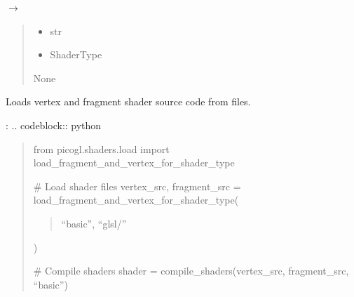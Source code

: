 \documentclass[a4paper,10pt,english,openany,oneside]{sphinxmanual}
\begin{document}
\begin{fulllineitems}
\label{\detokenize{api/shaders:picogl.shaders.load.load_fragment_and_vertex_for_shader_type}}
\pysigstartsignatures
\pysiglinewithargsret
{}
{\sphinxparamcomma {}}
{{ $\rightarrow$ \DUrole{p}{{[}}\DUrole{p}{{]}}}}
\pysigstopsignatures\begin{quote}\begin{description}
\begin{itemize}
\item {} 
\sphinxAtStartPar
{} \textendash{} str

\item {} 
\sphinxAtStartPar
{} \textendash{} ShaderType

\end{itemize}

\sphinxAtStartPar
None

\end{description}\end{quote}

\end{fulllineitems}


\sphinxAtStartPar
Loads vertex and fragment shader source code from files.

\sphinxAtStartPar
{}:
.. code\sphinxhyphen{}block:: python
\begin{quote}

\sphinxAtStartPar
from picogl.shaders.load import load\_fragment\_and\_vertex\_for\_shader\_type

\sphinxAtStartPar
\# Load shader files
vertex\_src, fragment\_src = load\_fragment\_and\_vertex\_for\_shader\_type(
\begin{quote}

\sphinxAtStartPar
“basic”, “glsl/”
\end{quote}

\sphinxAtStartPar
)

\sphinxAtStartPar
\# Compile shaders
shader = compile\_shaders(vertex\_src, fragment\_src, “basic”)
\end{quote}
\end{document}
